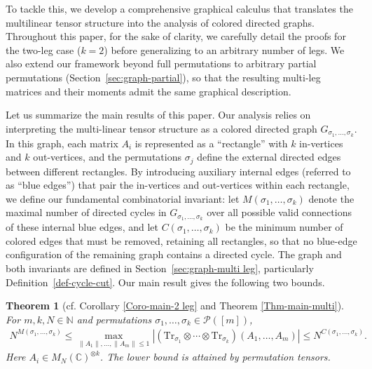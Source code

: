 \documentclass[12pt]{article}
\numberwithin{equation}{section}
\theoremstyle{plain}
\newtheorem*{theorem*}{Theorem}
\def\bN{\mathbb N}
\def\bC{\mathbb C}
\def\cP{\mathcal P}
\def\Tr{\mathrm {Tr}}
\begin{document}
To tackle this, we develop a comprehensive graphical calculus that translates the multilinear tensor structure into the analysis of colored directed graphs. Throughout this paper, for the sake of clarity, we carefully detail the proofs for the two-leg case ($k=2$) before generalizing to an arbitrary number of legs. We also extend our framework beyond full permutations to arbitrary partial permutations (Section~\ref{sec:graph-partial}), so that the resulting multi-leg matrices and their moments admit the same graphical description.

Let us summarize the main results of this paper. Our analysis relies on interpreting the multi-linear tensor structure as a colored directed graph $G_{\sigma_1, \ldots, \sigma_k}$. In this graph, each matrix $A_i$ is represented as a ``rectangle'' with $k$ in-vertices and $k$ out-vertices, and the permutations $\sigma_j$ define the external directed edges between different rectangles. By introducing auxiliary internal edges (referred to as ``blue edges'') that pair the in-vertices and out-vertices within each rectangle, we define our fundamental combinatorial invariant: let $M(\sigma_1, \ldots, \sigma_k)$ denote the maximal number of directed cycles in $G_{\sigma_1, \ldots, \sigma_k}$ over all possible valid connections of these internal blue edges, and let $C(\sigma_1,\ldots,\sigma_k)$ be the minimum number of colored edges that must be removed, retaining all rectangles, so that no blue-edge configuration of the remaining graph contains a directed cycle. The graph and both invariants are defined in Section~\ref{sec:graph-multi leg}, particularly Definition~\ref{def-cycle-cut}. Our main result gives the following two bounds.

\begin{theorem*}[cf. Corollary \ref{Coro-main-2 leg} and Theorem \ref{Thm-main-multi}]
For $m,k,N\in\bN$ and permutations $\sigma_1,\ldots,\sigma_k\in\cP([m])$,
\begin{align*}
N^{M(\sigma_1,\ldots,\sigma_k)}
\le \max_{\|A_1\|,\ldots,\|A_m\|\le1}
\left|(\Tr_{\sigma_1}\otimes\cdots\otimes\Tr_{\sigma_k})(A_1,\ldots,A_m)\right|
\le N^{C(\sigma_1,\ldots,\sigma_k)}.
\end{align*}
Here $A_i\in M_N(\bC)^{\otimes k}$. The lower bound is attained by permutation tensors.
\end{theorem*}
\end{document}
